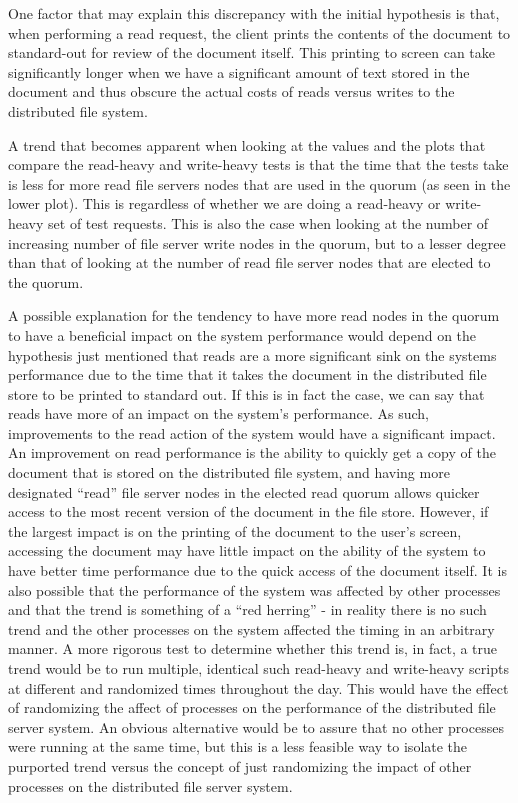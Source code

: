 \documentclass
[english,a4paper]{article}
\begin{document}
One factor that may explain this discrepancy with the initial
hypothesis is that, when performing a read request, the client prints
the contents of the document to standard-out for review of the
document itself. This printing to screen can take significantly longer
when we have a significant amount of text stored in the document and
thus obscure the actual costs of reads versus writes to the
distributed file system.

A trend that becomes apparent when looking at the values and the plots
that compare the read-heavy and write-heavy tests is that the time
that the tests take is less for more read file servers nodes that are
used in the quorum (as seen in the lower plot). This is regardless of
whether we are doing a read-heavy or write-heavy set of test
requests. This is also the case when looking at the number of
increasing number of file server write nodes in the quorum, but to a
lesser degree than that of looking at the number of read file server
nodes that are elected to the quorum.

A possible explanation for the tendency to have more read nodes in the
quorum to have a beneficial impact on the system performance would depend on the
hypothesis just mentioned that reads are a more significant sink on
the systems performance due to the time that it takes the document in
the distributed file store to be printed to standard out. If this is
in fact the case, we can say that reads have more of an impact on the
system's performance. As such, improvements to the read action of the
system would have a significant impact. An improvement on read
performance is the ability to quickly get a copy of the document that
is stored on the distributed file system, and having more designated
``read'' file server nodes in the elected read quorum allows quicker
access to the most recent version of the document in the file
store. However, if the largest impact is on the printing of the
document to the user's screen, accessing the document may have little
impact on the ability of the system to have better time performance
due to the quick access of the document itself. It is also possible
that the performance of the system was affected by other processes and
that the trend is something of a ``red herring'' - in reality there is
no such trend and the other processes on the system affected the
timing in an arbitrary manner. A more rigorous test to determine
whether this trend is, in fact, a true trend would be to run multiple,
identical such read-heavy and write-heavy scripts at different and
randomized times throughout the day. This would have the effect of
randomizing the affect of processes on the performance of the
distributed file server system. An obvious alternative would be to
assure that no other processes were running at the same time, but this
is a less feasible way to isolate the purported trend versus the
concept of just randomizing the impact of other processes on the
distributed file server system.



\newpage


\end{document}
